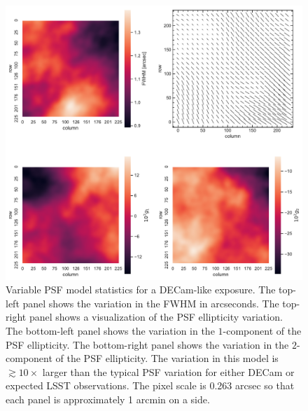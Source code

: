 \documentclass[iop, appendixfloats, numberedappendix, apj]{emulateapj}
\begin{document}
\begin{figure}
    \begin{center}
        \includegraphics[width=\textwidth]{figures/pspsf.pdf}
        \caption{
            Variable PSF model statistics for a DECam-like exposure. The top-left
        panel shows the variation in the FWHM in arcseconds. The top-right panel
        shows a visualization of the PSF ellipticity variation. The bottom-left panel shows
        the variation in the $1$-component of the PSF ellipticity. The bottom-right panel
        shows the variation in the $2$-component of the PSF ellipticity. The variation in
        this model is $\gtrsim10\times$ larger than the typical PSF variation for
        either DECam or expected LSST observations. The pixel scale is 0.263 arcsec
        so that each panel is approximately 1 arcmin on a side.
        \label{fig:pspsf}}
    \end{center}
\end{figure}
\end{document}
